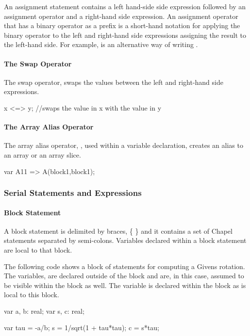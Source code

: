 An assignment statement contains a left hand-side side
expression followed by an assignment operator and a right-hand
side expression.
An assignment operator that has a binary operator
as a prefix is a short-hand notation for applying the binary
operator to the left and right-hand side expressions 
assigning the result to the left-hand side.  For example,
 is an alternative way of writing .

\paragraph{The Swap Operator}
The swap operator, \chpl{<=>} swaps the values between
the left and right-hand side expressions.
\begin{chapel}
x <=> y; //swaps the value in x with the value in y
\end{chapel}

\paragraph{The Array Alias Operator}
The array alias operator, \chpl{=>}, used within a
variable declaration, creates an alias to an array or 
an array slice.  
\begin{chapel}
var A11 => A(block1,block1);
\end{chapel}


\subsubsection{Serial Statements and Expressions}

\paragraph{Block Statement}  
A block statement is delimited by braces, \{ \} and it
contains a set of Chapel statements separated by semi-colons.  
Variables declared within a block statement are local to that block.

\begin{example}
The following code shows a block of statements for computing
a Givens rotation.  The variables,  are declared
outside of the block and are, in this case, assumed to be visible
within the block as well.  The variable  is declared 
within the block as is local to this block.
\begin{chapel}

var a, b: real;
var s, c: real;

{
  var tau = -a/b;
  s = 1/sqrt(1 + tau*tau);
  c = s*tau;
}

\end{chapel} 
\end{example} 

